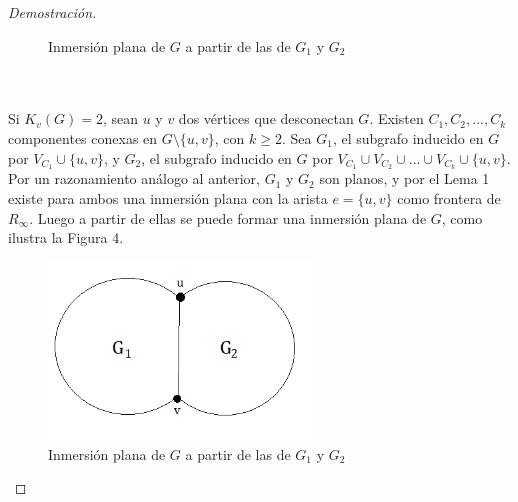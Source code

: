 \documentclass{article}
\begin{document}
\begin{proof}[Demostración]
\begin{figure}[htp]
\caption{Inmersión plana de $G$ a partir de las de $G_1$ y $G_2$}
\label{fig:kura1}
\end{figure} 
\\ \\
    Si $K_v(G) = 2$, sean $u$ y $v$ dos vértices que desconectan $G$. Existen $C_1, C_2, ..., C_k$ componentes conexas en $G\setminus\{u, v\}$, con $k \ge 2$. Sea $G_1$, el subgrafo inducido en $G$ por $V_{C_1} \cup \{u, v\}$, y $G_2$, el subgrafo inducido en $G$ por $V_{C_1} \cup V_{C_2} \cup ... \cup V_{C_k} \cup \{u, v\}$. \\ 
    Por un razonamiento análogo al anterior, $G_1$ y $G_2$ son planos, y por el Lema 1 existe para ambos una inmersión plana con la arista $e = \{u,v\}$ como frontera de $R_\infty$. Luego a partir de ellas se puede formar una inmersión plana de $G$, como ilustra la Figura 4. \\

\begin{figure}[htp]
\centering
\includegraphics[width=7cm]{img/kura4}
\caption{Inmersión plana de $G$ a partir de las de $G_1$ y $G_2$}
\label{fig:kura1}
\end{figure}


\end{proof}
\end{document}

